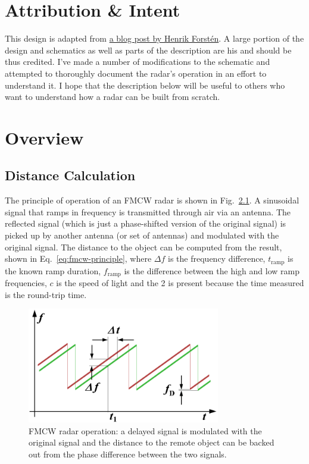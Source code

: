 \documentclass{default}
\begin{document}
\tableofcontents
\hypersetup{linkcolor=red}

\chapter{Attribution \& Intent}
\label{cha:attribution}

This design is adapted from
\href{http://hforsten.com/third-version-of-homemade-6-ghz-fmcw-radar.html}{a blog post by Henrik
  Forst\'en}. A large portion of the design and schematics as well as parts of the description are
his and should be thus credited. I've made a number of modifications to the schematic and attempted
to thoroughly document the radar's operation in an effort to understand it. I hope that the
description below will be useful to others who want to understand how a radar can be built from
scratch.

\chapter{Overview}
\label{cha:overview}

\section{Distance Calculation}
\label{sec:distance}

The principle of operation of an FMCW radar is shown in Fig.~\ref{fig:fmcw-principle}. A sinusoidal
signal that ramps in frequency is transmitted through air via an antenna. The reflected signal
(which is just a phase-shifted version of the original signal) is picked up by another antenna (or
set of antennas) and modulated with the original signal. The distance to the object can be computed
from the result, shown in Eq.~\ref{eq:fmcw-principle}, where $\Delta f$ is the frequency difference,
$t_{\text{ramp}}$ is the known ramp duration, $f_{\text{ramp}}$ is the difference between the high
and low ramp frequencies, $c$ is the speed of light and the 2 is present because the time measured
is the round-trip time.

\begin{figure}[h]
        \centering
        \includegraphics[width=0.75\textwidth]{data/fmcw-principle}
        \caption{FMCW radar operation: a delayed signal is modulated with the original signal and
          the distance to the remote object can be backed out from the phase difference between the
          two signals.}
        \label{fig:fmcw-principle}
\end{figure}
\end{document}
